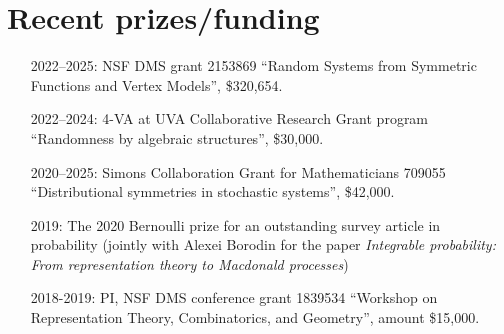 \documentclass[letterpaper,11pt]{article}
\begin{document}
\section*{Recent prizes/funding}
\begin{itemize}
	\item [2022--2025:]
	NSF DMS grant 2153869 
	``Random Systems from Symmetric Functions and Vertex Models'',
	\$320,654.

	\item [2022--2024:]
	4-VA at UVA Collaborative Research Grant program
	``Randomness by algebraic structures'',
	\$30,000.

	
	\item [2020--2025:]
		Simons Collaboration Grant for Mathematicians 709055
		``Distributional symmetries in stochastic systems'',
		\$42,000.
	\item [2019:] 
		The 2020 Bernoulli prize for an outstanding survey article in probability 
		(jointly with Alexei Borodin for the paper \emph{Integrable probability: From representation theory to
		Macdonald processes})
	\item
		[2018-2019:] PI,
				NSF DMS conference grant 
				1839534
				``Workshop on Representation Theory, Combinatorics, and Geometry'',
				amount \$15,000.


\end{itemize}
\end{document}
